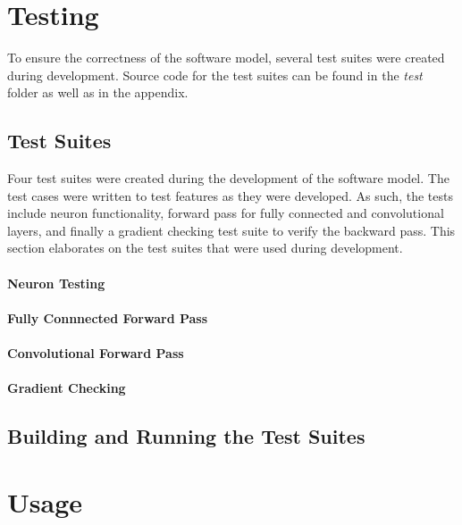 \section{Testing}
To ensure the correctness of the software model, several test suites were created during development. Source code for the test suites can be found in the \textit{test} folder as well as in the appendix.
\subsection{Test Suites}
Four test suites were created during the development of the software model. The test cases were written to test features as they were developed. As such, the tests include neuron functionality, forward pass for fully connected and convolutional layers, and finally a gradient checking test suite to verify the backward pass. This section elaborates on the test suites that were used during development.

\paragraph{Neuron Testing}
\paragraph{Fully Connnected Forward Pass}
\paragraph{Convolutional Forward Pass}
\paragraph{Gradient Checking}

\subsection{Building and Running the Test Suites}


\section{Usage}\label{sw-usage}

